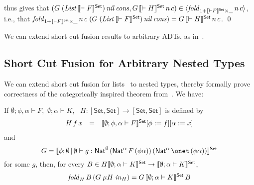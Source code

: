 \documentclass{lmcs}
\theoremstyle{plain}\newtheorem{satz}[thm]{Satz}
\newcommand{\set}{\mathsf{Set}}
\begin{document}
thus gives that $(G \;(\mathit{List}\,\setsem{\vdash
  F})\,\mathit{nil} \,\mathit{cons}, G \,\setsem{\vdash H} \,
n\, c) \in \graph{\mathit{fold}_{1 + \setsem{\vdash F} \times \_}\, n\, c}$, i.e.,
that $\mathit{fold}_{1 + \setsem{\vdash F} \times \_}\, n\, c\; (G\;
(\mathit{List}\,\setsem{\vdash F})\, \mathit{nil}\, \mathit{cons})
= G \,\setsem{\vdash H}\, n\, c$.
\qed

We can extend short cut fusion results to arbitrary ADTs, as
in~\cite{joh02,pit98}.

\subsection{Short Cut Fusion for Arbitrary Nested
  Types}\label{sec:short-cut-nested} 

We can extend short cut fusion for lists~\cite{glp93} to nested types,
thereby formally prove correctness of the categorically inspired
theorem from~\cite{jg10}.  We have:
\begin{thm}\label{thm:short-cut-nested}
If $\emptyset;\phi,\alpha \vdash F$, \,$\emptyset; \alpha
\vdash K$, \,
$H : [\set,\set] \to [\set,\set]$ is defined by
\[\begin{array}{lll}
H\,f\,x & = & \setsem{\emptyset; \phi, \alpha \vdash F}[\phi :=
  f][\alpha := x]\\
\end{array}\]
and 
\[G = \setsem{\phi;\emptyset\,|\,\emptyset \vdash g :
\Nat^\emptyset\,(\Nat^\alpha\,F\,(\phi\alpha))\,(\Nat^\alpha\,\onet \,
(\phi\alpha))}\] for some $g$, then, for every $B \in H
\setsem{\emptyset;\alpha \vdash K} \rightarrow \setsem{\emptyset;
  \alpha \vdash K}$,
$$\mathit{fold}_{H}\, B \, (G\; \mu H \; \mathit{in}_{H}) = G
\,\setsem{\emptyset;\alpha \vdash K}\, B$$
\end{thm}
\end{document}
